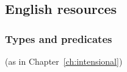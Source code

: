   
  
  

 
 

  
 


\subsection{English resources} 

 \subsubsection{Types and predicates} (as in Chapter~\ref{ch:intensional})


  



